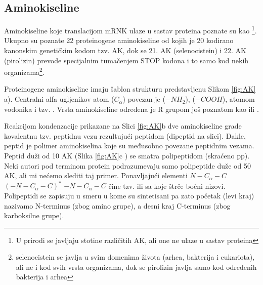 \subsection{Aminokiseline}
Aminokiseline koje translacijom mRNK ulaze u sastav proteina poznate su kao
\footnote{U prirodi se javljaju stotine različitih AK, ali
one ne ulaze u sastav proteina}.  Ukupno su poznate 22 proteinogene
aminokiseline od kojih je 20 kodirano kanonskim genetičkim kodom tzv.
 AK, dok se 21. AK (selenocistein) i 22. AK (pirolizin)
prevode specijalnim tumačenjem STOP kodona i to samo kod nekih organizama\footnote{
  selenocistein se javlja u svim domenima života (arhea, bakterija i
  eukariota), ali ne i kod svih vrsta organizama, dok se pirolizin javlja samo
kod određenih bakterija i arhea}. 

Proteinogene aminokiseline imaju šablon strukturu predstavljenu Slikom \ref{fig:AK} a).
Centralni alfa ugljenikov atom ($C_{\alpha}$) povezan je  ($-NH_2$), 
 ($-COOH$), atomom vodonika i tzv. .
Vrsta aminokiseline određena je R grupom još poznatom kao  ili  .

Reakcijom kondenzacije prikazane na Slici \ref{fig:AK}b dve aminokiseline
grade kovalentnu tzv. peptidnu vezu rezultujući peptidom (dipeptid na slici).
Dakle, peptid je polimer aminokiselina koje su međusobno povezane peptidnim
vezama.  Peptid duži od 10 AK (Slika \ref{fig:AK}c ) se smatra polipeptidom (skraćeno pp).
Neki autori pod terminom protein podrazumevaju samo polipeptide duže od 50 AK,
ali mi nećemo slediti taj primer.
Ponavljajući elementi $N-C_\alpha-C$ $(-N-C_\alpha-C)^*$ $-N-C_\alpha-C$ čine
tzv.  ili  sa koje štrče bočni nizovi.
Polipeptidi se zapisuju u smeru u kome su sintetisani pa zato  početak (levi kraj)
nazivamo N-terminus (zbog amino grupe), a desni kraj C-terminus (zbog karboksilne grupe).


